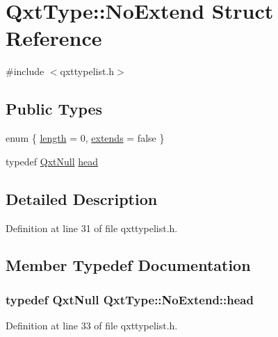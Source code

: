 \hypertarget{struct_qxt_type_1_1_no_extend}{\section{Qxt\-Type\-:\-:No\-Extend Struct Reference}
\label{struct_qxt_type_1_1_no_extend}
}


{\ttfamily \#include $<$qxttypelist.\-h$>$}

\subsection*{Public Types}
\begin{DoxyCompactItemize}
\item 
enum \{ \hyperlink{struct_qxt_type_1_1_no_extend_a8ed63dff8fac2c0a1c00ad54f033e6fead31ee7c652329d8e53bdc514da30264f}{length} = 0, 
\hyperlink{struct_qxt_type_1_1_no_extend_a8ed63dff8fac2c0a1c00ad54f033e6fea4ffa43af688cbd66562d1f8d693dd9dc}{extends} = false
 \}
\item 
typedef \hyperlink{struct_qxt_null}{Qxt\-Null} \hyperlink{struct_qxt_type_1_1_no_extend_a728a1ba31495de74a98bef69255f666a}{head}
\end{DoxyCompactItemize}


\subsection{Detailed Description}


Definition at line 31 of file qxttypelist.\-h.



\subsection{Member Typedef Documentation}
\hypertarget{struct_qxt_type_1_1_no_extend_a728a1ba31495de74a98bef69255f666a}{
\subsubsection[{head}]{\setlength{\rightskip}{0pt plus 5cm}typedef {\bf Qxt\-Null} {\bf Qxt\-Type\-::\-No\-Extend\-::head}}}\label{struct_qxt_type_1_1_no_extend_a728a1ba31495de74a98bef69255f666a}


Definition at line 33 of file qxttypelist.\-h.



